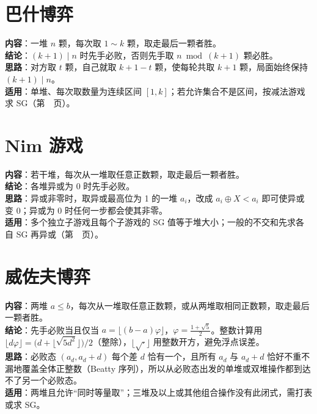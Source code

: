 \section{巴什博弈}\label{knowledge-game-bash}
\textbf{内容}：一堆 $n$ 颗，每次取 $1\sim k$ 颗，取走最后一颗者胜。\\
\textbf{结论}：$(k+1)\mid n$ 时先手必败，否则先手取 $n\bmod(k+1)$ 颗必胜。\\
\textbf{思路}：对方取 $t$ 颗，自己就取 $k+1-t$ 颗，使每轮共取 $k+1$ 颗，局面始终保持 $(k+1)\mid n$。\\
\textbf{适用}：单堆、每次取数量为连续区间 $[1,k]$；若允许集合不是区间，按减法游戏求 SG（第~\pageref{knowledge-subtraction-game}~页）。

\section{Nim 游戏}\label{knowledge-game-nim}
\textbf{内容}：若干堆，每次从一堆取任意正数颗，取走最后一颗者胜。\\
\textbf{结论}：各堆异或为 $0$ 时先手必败。\\
\textbf{思路}：异或非零时，取异或最高位为 1 的一堆 $a_i$，改成 $a_i\oplus X<a_i$ 即可使异或变 $0$；异或为 $0$ 时任何一步都会使其非零。\\
\textbf{适用}：多个独立子游戏且每个子游戏的 SG 值等于堆大小；一般的不交和先求各自 SG 再异或（第~\pageref{knowledge-sg}~页）。

\section{威佐夫博弈}\label{knowledge-game-wythoff}
\textbf{内容}：两堆 $a\le b$，每次从一堆取任意正数颗，或从两堆取相同正数颗，取走最后一颗者胜。\\
\textbf{结论}：先手必败当且仅当 $a=\lfloor (b-a)\varphi\rfloor$，$\varphi=\frac{1+\sqrt5}{2}$。整数计算用 $\lfloor d\varphi\rfloor=\bigl(d+\lfloor\sqrt{5d^2}\rfloor\bigr)/2$（整除），$\lfloor\sqrt{\cdot}\rfloor$ 用整数开方，避免浮点误差。\\
\textbf{思路}：必败态 $(a_d,a_d+d)$ 每个差 $d$ 恰有一个，且所有 $a_d$ 与 $a_d+d$ 恰好不重不漏地覆盖全体正整数（Beatty 序列），所以从必败态出发的单堆或双堆操作都到达不了另一个必败态。\\
\textbf{适用}：两堆且允许“同时等量取”；三堆及以上或其他组合操作没有此闭式，需打表或求 SG。

